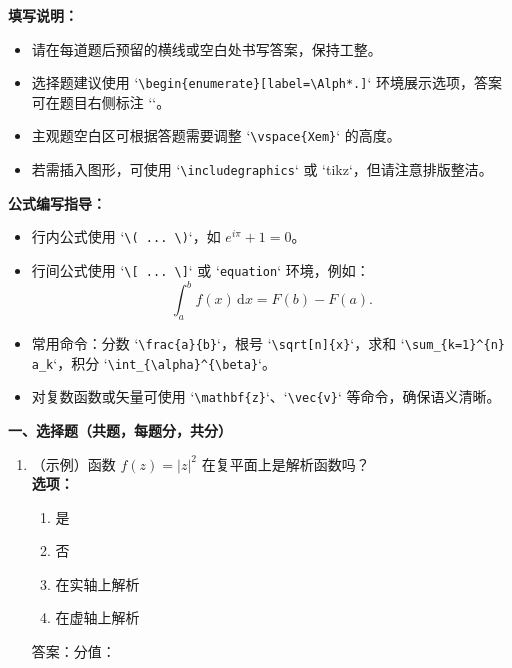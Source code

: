 \documentclass[a4paper]{article}
\begin{document}
\begin{flushleft}

\textbf{填写说明：}
\begin{itemize}
    \item 请在每道题后预留的横线或空白处书写答案，保持工整。
    \item 选择题建议使用 `\verb|\begin{enumerate}[label=\Alph*.]|` 环境展示选项，答案可在题目右侧标注 `\underline{\hspace{1.5cm}}`。
    \item 主观题空白区可根据答题需要调整 `\verb|\vspace{Xem}|` 的高度。
    \item 若需插入图形，可使用 `\verb|\includegraphics|` 或 `tikz`，但请注意排版整洁。
\end{itemize}

\textbf{公式编写指导：}
\begin{itemize}
    \item 行内公式使用 `\verb|\( ... \)|`，如 \( e^{i\pi}+1=0 \)。
    \item 行间公式使用 `\verb|\[ ... \]|` 或 `\verb|equation|` 环境，例如：
    \[
        \int_a^b f(x)\,\mathrm{d}x = F(b) - F(a).
    \]
    \item 常用命令：分数 `\verb|\frac{a}{b}|`，根号 `\verb|\sqrt[n]{x}|`，求和 `\verb|\sum_{k=1}^{n} a_k|`，积分 `\verb|\int_{\alpha}^{\beta}|`。
    \item 对复数函数或矢量可使用 `\verb|\mathbf{z}|`、`\verb|\vec{v}|` 等命令，确保语义清晰。
\end{itemize}

\textbf{一、选择题（共\underline{\hspace{1cm}}题，每题\underline{\hspace{1cm}}分，共\underline{\hspace{1cm}}分）}
\begin{enumerate}[label=\arabic*.]
    \item （示例）函数 \( f(z) = |z|^2 \) 在复平面上是解析函数吗？\\
    \textbf{选项：}
    \begin{enumerate}[label=\Alph*.]
        \item 是
        \item 否
        \item 在实轴上解析
        \item 在虚轴上解析
    \end{enumerate}
    答案：\underline{\hspace{1.5cm}}\hfill 分值：\underline{\hspace{1cm}}


\end{enumerate}
\end{flushleft}
\end{document}
